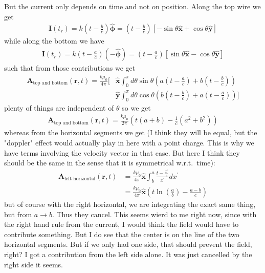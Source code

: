 But the current only depends on time and not on position. Along the top wire we get \begin{align*}
    \mathbf{I}(t_r) = k(t - \frac{b}{c})\hat{\boldsymbol{\phi}} = (t - \frac{b}{c})\left[ - \sin \theta \hat{\mathbf{x}} + \cos \theta \hat{\mathbf{y}} \right] 
\end{align*}
while along the bottom we have \begin{align*}
    \mathbf{I}(t_r) = k(t - \frac{a}{c})(-\hat{\boldsymbol{\phi}}) = (t - \frac{a}{c})\left[ \sin \theta \hat{\mathbf{x}} - \cos \theta \hat{\mathbf{y}} \right] 
\end{align*}
such that from those contributions we get \begin{align*}
    \mathbf{A}_{\text{top and bottom}}(\mathbf{r}, t) = \frac{k\mu_0}{4 \pi } \biggl[ &\hat{\mathbf{x}} \int_0 ^\pi  d \theta \sin \theta \left( a\left( t- \frac{a}{c} \right) +  b\left(t - \frac{b}{c}\right) \right)\\
      &\hat{\mathbf{y}} \int_0 ^\pi d \theta \cos \theta \left( b \left( t - \frac{b}{c} \right) + a \left( t - \frac{a}{c} \right)   \right) \biggr]
\end{align*}
plenty of things are independent of \(\theta \) so we get \begin{align*}
    \mathbf{A}_{\text{top and bottom}}(\mathbf{r}, t) = \frac{k\mu_0}{2\pi } \left( t (a + b) -  \frac{1}{c}\left( a^{2} + b^{2}  \right) \right) 
\end{align*}
whereas from the horizontal segments we get (I think they will be equal, but the "doppler" effect would actually play in here with a point charge. This is why we have terms involving the velocity vector in that case. But here I think they should be the same in the sense that it is symmetrical w.r.t.\ time):
\begin{align*}
    \mathbf{A}_{\text{left horizontal}}(\mathbf{r}, t) &= \frac{k\mu_0}{4 \pi } \hat{\mathbf{x}} \int_b ^a \frac{t - \frac{x^{\prime}}{c} }{x^{\prime}} dx^{\prime} \\
    &=  \frac{k\mu_0}{4 \pi } \hat{\mathbf{x}} \left( t \ln \left(\frac{a}{b}\right) - \frac{a - b}{c} \right) 
\end{align*}
but of course with the right horizontal, we are integrating the exact same thing, but from \(a \to  b\). Thus they cancel. This seems wierd to me right now, since with the right hand rule from the current, I would think the field would have to contribute something. But I do see that the center is on the line of the two horizontal segments. But if we only had one side, that should prevent the field, right? I got a contribution from the left side alone. It was just cancelled by the right side it seems.  


